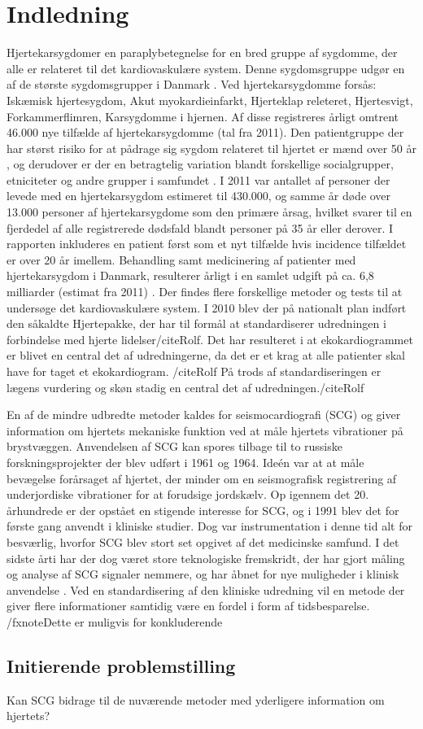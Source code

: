 \chapter{Indledning} \label{Indledning}

\textquotedbl Hjertekarsygdom\textquotedbl er en paraplybetegnelse for en bred gruppe af sygdomme, der alle er relateret til det kardiovaskulære system. Denne sygdomsgruppe udgør en af de største sygdomsgrupper i Danmark \cite{livet}. Ved hjertekarsygdomme forsås: Iskæmisk hjertesygdom, Akut myokardieinfarkt, Hjerteklap releteret, Hjertesvigt, Forkammerflimren, Karsygdomme i hjernen\cite{2011}. Af disse registreres årligt omtrent 46.000 nye tilfælde af hjertekarsygdomme (tal fra 2011). Den patientgruppe der har størst risiko for at pådrage sig sygdom relateret til hjertet er mænd over 50 år \cite{2011}, og derudover er der en betragtelig variation blandt forskellige socialgrupper, etniciteter og andre grupper i samfundet \cite{hjerteforening}. I 2011 var antallet af personer der levede med en hjertekarsygdom estimeret til 430.000, og samme år døde over 13.000 personer af hjertekarsygdome som den primære årsag, hvilket svarer til en fjerdedel af alle registrerede dødsfald blandt personer på 35 år eller derover. I rapporten inkluderes en patient først som et nyt tilfælde hvis incidence tilfældet er over 20 år imellem.\cite{2011} Behandling samt medicinering af patienter med hjertekarsygdom i Danmark, resulterer årligt i en samlet udgift på ca. 6,8 milliarder (estimat fra 2011) \cite{hjerteforening}. Der findes flere forskellige metoder og tests til at undersøge det kardiovaskulære system. I 2010 blev der på nationalt plan indført den såkaldte Hjertepakke, der har til formål at standardiserer udredningen i forbindelse med hjerte lidelser/cite{Rolf}. Det har resulteret i at ekokardiogrammet er blivet en central det af udredningerne, da det er et krag at alle patienter skal have for taget et ekokardiogram. /cite{Rolf} På trods af standardiseringen er lægens vurdering og skøn stadig en central det af udredningen./cite{Rolf}


 En af de mindre udbredte metoder kaldes for seismocardiografi (SCG) og giver information om hjertets mekaniske funktion ved at måle hjertets vibrationer på brystvæggen. Anvendelsen af SCG kan spores tilbage til to russiske forskningsprojekter der blev udført  i 1961 og 1964. Ideén var at at måle bevægelse forårsaget af hjertet, der minder om en seismografisk registrering af underjordiske vibrationer for at forudsige jordskælv. Op igennem det 20. århundrede er der opstået en stigende interesse for SCG, og i 1991 blev det for første gang anvendt i kliniske studier. Dog var instrumentation i denne tid alt for besværlig, hvorfor SCG blev stort set opgivet af det medicinske samfund. I det sidste årti har der dog været store teknologiske fremskridt, der har gjort måling og analyse af SCG signaler nemmere, og har åbnet for nye muligheder i klinisk anvendelse \cite{onan} \cite{zanetti}. Ved en standardisering af den kliniske udredning vil en metode der giver flere informationer samtidig være en fordel i form af tidsbesparelse. /fxnote{Dette er muligvis for konkluderende}

\section{Initierende problemstilling} Kan SCG bidrage til de nuværende metoder med yderligere information om hjertets?